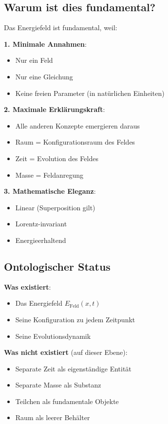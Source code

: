 \subsection{Warum ist dies fundamental?}

\begin{philosophical}
Das Energiefeld ist fundamental, weil:

\textbf{1. Minimale Annahmen}:
\begin{itemize}
\item Nur ein Feld
\item Nur eine Gleichung
\item Keine freien Parameter (in natürlichen Einheiten)
\end{itemize}

\textbf{2. Maximale Erklärungskraft}:
\begin{itemize}
\item Alle anderen Konzepte emergieren daraus
\item Raum = Konfigurationsraum des Feldes
\item Zeit = Evolution des Feldes
\item Masse = Feldanregung
\end{itemize}

\textbf{3. Mathematische Eleganz}:
\begin{itemize}
\item Linear (Superposition gilt)
\item Lorentz-invariant
\item Energieerhaltend
\end{itemize}
\end{philosophical}

\subsection{Ontologischer Status}

\textbf{Was existiert}:
\begin{itemize}
\item Das Energiefeld $E_{\text{Feld}}(x,t)$
\item Seine Konfiguration zu jedem Zeitpunkt
\item Seine Evolutionsdynamik
\end{itemize}

\textbf{Was nicht existiert} (auf dieser Ebene):
\begin{itemize}
\item Separate Zeit als eigenständige Entität
\item Separate Masse als Substanz
\item Teilchen als fundamentale Objekte
\item Raum als leerer Behälter
\end{itemize}

